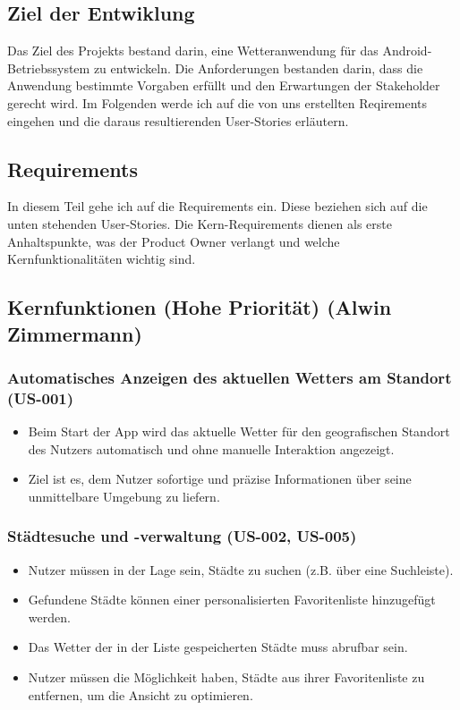 \documentclass{article}
\begin{document}
\subsection{Ziel der Entwiklung}
Das Ziel des Projekts bestand darin, eine Wetteranwendung für das Android-Betriebssystem zu entwickeln. Die Anforderungen bestanden darin, dass die Anwendung bestimmte Vorgaben erfüllt und den Erwartungen der Stakeholder gerecht wird.
Im Folgenden werde ich auf die von uns erstellten Reqirements eingehen und die daraus resultierenden User-Stories erläutern.

\subsection{Requirements}
In diesem Teil gehe ich auf die Requirements ein. Diese beziehen sich auf die unten stehenden User-Stories. Die Kern-Requirements dienen als erste Anhaltspunkte, was der Product Owner verlangt und welche Kernfunktionalitäten wichtig sind.

\subsection{Kernfunktionen (Hohe Priorität) \small{(Alwin Zimmermann)}}

\subsubsection{Automatisches Anzeigen des aktuellen Wetters am Standort (US-001)}
\begin{itemize}
    \item Beim Start der App wird das aktuelle Wetter für den geografischen Standort des Nutzers automatisch und ohne manuelle Interaktion angezeigt.
    \item Ziel ist es, dem Nutzer sofortige und präzise Informationen über seine unmittelbare Umgebung zu liefern.
\end{itemize}

\subsubsection{Städtesuche und -verwaltung (US-002, US-005)}
\begin{itemize}
    \item Nutzer müssen in der Lage sein, Städte zu suchen (z.B. über eine Suchleiste).
    \item Gefundene Städte können einer personalisierten Favoritenliste hinzugefügt werden.
    \item Das Wetter der in der Liste gespeicherten Städte muss abrufbar sein.
    \item Nutzer müssen die Möglichkeit haben, Städte aus ihrer Favoritenliste zu entfernen, um die Ansicht zu optimieren.
\end{itemize}
\end{document}
